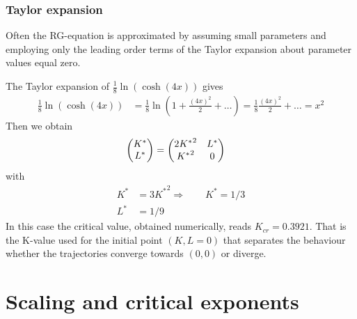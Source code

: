 \subsubsection{Taylor expansion}

Often the RG-equation is approximated by assuming small parameters and employing only the 
leading order terms of the Taylor expansion about parameter values equal zero.

The Taylor expansion of $\frac{1}{8} \ln(\cosh(4x))$ gives
%
\begin{align*}
\frac{1}{8} \ln(\cosh(4x)) &= \frac{1}{8} \ln( 1 + \frac{(4x)^{2}}{2} +\ldots  )  = \frac{1}{8} \frac{(4x)^{2}}{2} + \ldots = x^{2}
\end{align*}
%
Then we obtain
%
\begin{align*}
\mqty(K^{*}\\L^{*})
&=
\mqty(
2 {K^{*}}^{2} & L^{*}\\
{K^{*}}^{2}&0
)
\end{align*}
%
with
\begin{align*}
K^{*} &= 3 {K^{*}}^{2}\Rightarrow\qquad K^{*}=1/3\\
L^{*} &= 1/9
\end{align*}
%
In this case the critical value,  obtained numerically, reads $K_{cr} = 0.3921$. That is the K-value used for the initial point $(K,L=0)$ that separates the behaviour whether the trajectories converge towards $(0,0)$
or diverge. 

\begin{comment}

%
\begin{align*}
\mqty(\var K'\\\var L')
&=
\mqty(
4 K^{*} & 1\\
2 K^{*}&0
)
\mqty(\var K\\\var L)
=
\mqty(
\frac{4}{3} & 1\\
\frac{2}{3}&0
)
\mqty(\var K\\\var L)
\end{align*}
%

\end{comment}


 
%



\section{Scaling and critical exponents}

